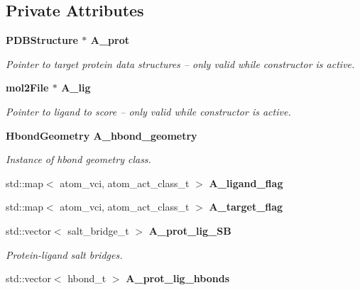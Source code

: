 \subsection*{Private Attributes}
\begin{CompactItemize}
\item 
\bf{PDBStructure} $\ast$ \bf{A\_\-prot}\label{classSimSite3D_1_1ProtLigScore_5b1a480b3bf5f9c011497ba534fa9461}

\begin{CompactList}\small\item\em Pointer to target protein data structures -- only valid while constructor is active. \item\end{CompactList}\item 
\bf{mol2File} $\ast$ \bf{A\_\-lig}\label{classSimSite3D_1_1ProtLigScore_dfbf1284c9cbed4b54206df9fdddef28}

\begin{CompactList}\small\item\em Pointer to ligand to score -- only valid while constructor is active. \item\end{CompactList}\item 
\bf{Hbond\-Geometry} \bf{A\_\-hbond\_\-geometry}\label{classSimSite3D_1_1ProtLigScore_6671697549e83639b589b71488f550d9}

\begin{CompactList}\small\item\em Instance of hbond geometry class. \item\end{CompactList}\item 
std::map$<$ atom\_\-vci, atom\_\-act\_\-class\_\-t $>$ \textbf{A\_\-ligand\_\-flag}\label{classSimSite3D_1_1ProtLigScore_8b4747bab4ae82a169058b0aef3a2f42}

\item 
std::map$<$ atom\_\-vci, atom\_\-act\_\-class\_\-t $>$ \textbf{A\_\-target\_\-flag}\label{classSimSite3D_1_1ProtLigScore_8f73fb747d5bf69e796cccad62f2926b}

\item 
std::vector$<$ salt\_\-bridge\_\-t $>$ \bf{A\_\-prot\_\-lig\_\-SB}\label{classSimSite3D_1_1ProtLigScore_0d045558a8b159755a49bfa691ea3977}

\begin{CompactList}\small\item\em Protein-ligand salt bridges. \item\end{CompactList}\item 
std::vector$<$ hbond\_\-t $>$ \bf{A\_\-prot\_\-lig\_\-hbonds}\label{classSimSite3D_1_1ProtLigScore_3cbb26774378dac3641e3060cc3bca30}


\end{CompactItemize}
